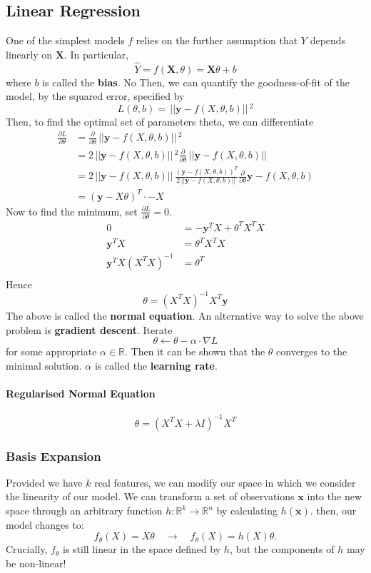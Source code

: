 \documentclass{article}
\renewcommand{\vec}[1]{\mathbf{#1}}
\newcommand{\norm}[1]{\,||#1||\,}
\newcommand{\diff}[2]{\frac{\partial #1}{\partial #2}}
\newcommand{\Reals}{\mathbb{R}}
\begin{document}
\subsection{Linear Regression}
One of the simplest models $f$ relies on the further assumption that $Y$ depends
linearly on $\vec{X}$. In particular,
\[
  \hat{Y} = f(\vec{X}, \theta) = \vec{X}\theta + b
\]
where $b$ is called the \textbf{bias}. No
Then, we can quantify the goodness-of-fit of the model, by the squared
error, specified by
\[
  L(\theta, b) = \norm{\vec{y} - f(X, \theta, b)}^2 
\]
Then, to find the optimal set of parameters theta, we can differentiate 
\begin{align*}
  \diff{L}{\theta} &= \diff{}{\theta}{\norm{\vec{y} - f(X, \theta, b)}^2 } \\
                   &= 2 \norm{\vec{y} - f(X, \theta, b)}^2 \diff{}{\theta}\norm{\vec{y} - f(X, \theta, b)}  \\
                   &= 2 \norm{\vec{y} - f(X, \theta, b)} \frac{(\vec{y} - f(X, \theta, b))^T}{2\norm{\vec{y} - f(X, \theta, b)}}\diff{}{\theta}\vec{y} - f(X, \theta, b)  \\
                   &= (\vec{y} - X\theta)^T \cdot -X
\end{align*}
Now to find the minimum, set $\diff{L}{\theta} = 0$.
\begin{align*}
  0 &= -\vec{y}^TX + \theta^TX^TX \\
  \vec{y}^TX &= \theta^TX^TX \\
  \vec{y}^TX(X^TX)^{-1} &= \theta^T \\
\end{align*}
Hence
\[
  \theta = (X^TX)^{-1}X^T\vec{y}
\]
The above is called the \textbf{normal equation}.
An alternative way to solve the above problem is \textbf{gradient descent}.
Iterate
\[
  \theta \leftarrow \theta - \alpha \cdot \nabla L
\]
for some appropriate $\alpha \in \Reals$. Then it can be shown that the $\theta$ converges
to the minimal solution. $\alpha$ is called the \textbf{learning rate}.
\paragraph{Regularised Normal Equation}
\[
  \theta = (X^TX + \lambda I)^{-1}X^T
\]
\subsubsection{Basis Expansion}
Provided we have $k$ real features, we can modify our space in which we consider
the linearity of our model. We can transform a set of observations $\vec{x}$ into the new
space through an arbitrary function $h: \Reals^k \to \Reals^n$ by calculating
$h(\vec{x})$.
then, our model changes to:
\[
  f_\theta(X) = X\theta \quad \to \quad f_\theta(X) = h(X)\theta.
\]
Crucially, $f_\theta$ is still linear in the space defined by $h$, but the
components of $h$ may be non-linear!
\end{document}
